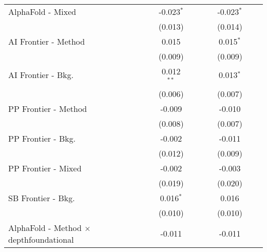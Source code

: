 \begin{tabular}{lcccccccc}
   AlphaFold - Mixed                              &         & -0.023$^{*}$  &       &       &         & -0.023$^{*}$  &       &   \\   
                                                  &         & (0.013)       &       &       &         & (0.014)       &       &   \\   
   AI Frontier - Method                           &         & 0.015         &       &       &         & 0.015$^{*}$   &       &   \\   
                                                  &         & (0.009)       &       &       &         & (0.009)       &       &   \\   
   AI Frontier - Bkg.                             &         & 0.012$^{**}$  &       &       &         & 0.013$^{*}$   &       &   \\   
                                                  &         & (0.006)       &       &       &         & (0.007)       &       &   \\   
   PP Frontier - Method                           &         & -0.009        &       &       &         & -0.010        &       &   \\   
                                                  &         & (0.008)       &       &       &         & (0.007)       &       &   \\   
   PP Frontier - Bkg.                             &         & -0.002        &       &       &         & -0.011        &       &   \\   
                                                  &         & (0.012)       &       &       &         & (0.009)       &       &   \\   
   PP Frontier - Mixed                            &         & -0.002        &       &       &         & -0.003        &       &   \\   
                                                  &         & (0.019)       &       &       &         & (0.020)       &       &   \\   
   SB Frontier - Bkg.                             &         & 0.016$^{*}$   &       &       &         & 0.016         &       &   \\   
                                                  &         & (0.010)       &       &       &         & (0.010)       &       &   \\   
   AlphaFold - Method $\times$ depthfoundational  &         & -0.011        &       &       &         & -0.011        &       &   \\   

\end{tabular}
